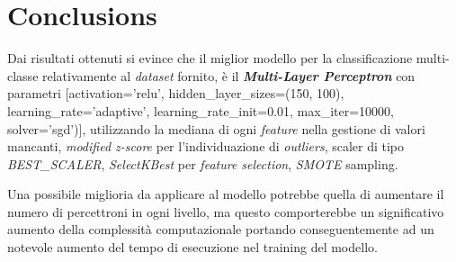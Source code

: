 \section{Conclusions}

        Dai risultati ottenuti si evince che il miglior modello per la classificazione multi-classe relativamente al \textit{dataset} fornito, è il \textbf{\textit{Multi-Layer Perceptron}} con parametri [activation='relu', hidden\_layer\_sizes=(150, 100), learning\_rate='adaptive', learning\_rate\_init=0.01, max\_iter=10000, solver='sgd')], utilizzando la mediana di ogni \textit{feature} nella gestione di valori mancanti, \textit{modified z-score} per l'individuazione di \textit{outliers}, scaler di tipo \textit{BEST\_SCALER}, \textit{SelectKBest} per \textit{feature selection}, \textit{SMOTE} sampling.
        \bigbreak
        
        Una possibile miglioria da applicare al modello potrebbe quella di aumentare il numero di percettroni in ogni livello, ma questo comporterebbe un significativo aumento della complessità computazionale portando conseguentemente ad un notevole aumento del tempo di esecuzione nel training del modello.